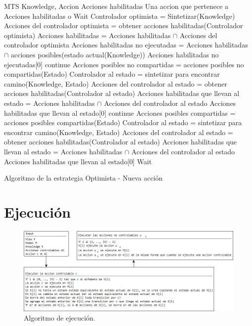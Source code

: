 \begin{algorithm}
\begin{algorithmic}
\REQUIRE MTS Knowledge, {Accion} Acciones habilitadas
\ENSURE Una accion que pertenece a Acciones habilitadas o Wait
\STATE Controlador optimista = Sintetizar(Knowledge)
\STATE Acciones del controlador optimista = obtener acciones habilitadas(Controlador optimista)
\STATE Acciones habilitadas = Acciones habilitadas $\cap$ Acciones del controlador optimista
\STATE Acciones habilitadas no ejecutadas = Acciones habilitadas $\cap$ acciones posibles(estado actual(Knowledge))
\RETURN Acciones habilitadas no ejecutadas[0]
\ELSE
{}
\STATE continue
\ENDIF
\STATE Acciones posibles no compartidas = acciones posibles no compartidas(Estado)
\STATE Controlador al estado = sintetizar para encontrar camino(Knowledge, Estado)
\STATE Acciones del controlador al estado = obtener acciones habilitadas(Controlador al estado)
\STATE Acciones habilitadas que llevan al estado = Acciones habilitadas $\cap$ Acciones del controlador al estado
\RETURN Acciones habilitadas que llevan al estado[0]
\ENDIF
\ENDIF
\ENDFOR
{}
\STATE continue
\ENDIF
\STATE Acciones posibles compartidas = acciones posibles compartidas(Estado)
\STATE Controlador al estado = sintetizar para encontrar camino(Knowledge, Estado)
\STATE Acciones del controlador al estado = obtener acciones habilitadas(Controlador al estado)
\STATE Acciones habilitadas que llevan al estado = Acciones habilitadas $\cap$ Acciones del controlador al estado
\RETURN Acciones habilitadas que llevan al estado[0]
\ENDIF
\ENDIF
\ENDFOR
\RETURN Wait
\ENDIF
\end{algorithmic}
\caption{Algoritmo de la estrategia Optimista - Nueva acción}
\end{algorithm}

\newpage

\section{Ejecución}

\begin{figure}[H]
  \centering
    \includegraphics[width=1.0\textwidth]{Imagenes/Algoritmo/Algoritmo_ejecutar.png}
  \caption{Algoritmo de ejecución.}
  \label{fig:Algoritmo_ejecutar}
\end{figure}


